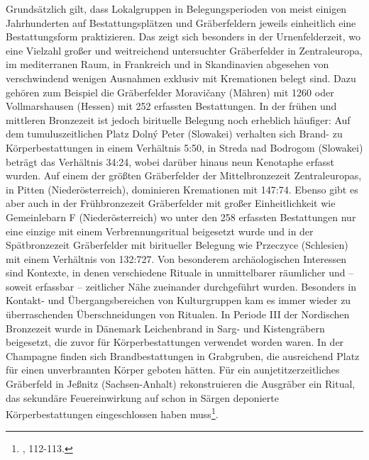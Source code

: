 \documentclass[openany,twoside,twocolumn]{book}
\let\rmarkdownfootnote\footnote%
\def\footnote{\protect\rmarkdownfootnote}
\begin{document}
Grundsätzlich gilt, dass Lokalgruppen in Belegungsperioden von meist
einigen Jahrhunderten auf Bestattungsplätzen und Gräberfeldern jeweils
einheitlich eine Bestattungsform praktizieren. Das zeigt sich besonders
in der Urnenfelderzeit, wo eine Vielzahl großer und weitreichend
untersuchter Gräberfelder in Zentraleuropa, im mediterranen Raum, in
Frankreich und in Skandinavien abgesehen von verschwindend wenigen
Ausnahmen exklusiv mit Kremationen belegt sind. Dazu gehören zum
Beispiel die Gräberfelder Moravičany (Mähren) mit 1260 oder
Vollmarshausen (Hessen) mit 252 erfassten Bestattungen. In der frühen
und mittleren Bronzezeit ist jedoch birituelle Belegung noch erheblich
häufiger: Auf dem tumuluszeitlichen Platz Dolný Peter (Slowakei)
verhalten sich Brand- zu Körperbestattungen in einem Verhältnis 5:50, in
Streda nad Bodrogom (Slowakei) beträgt das Verhältnis 34:24, wobei
darüber hinaus neun Kenotaphe erfasst wurden. Auf einem der größten
Gräberfelder der Mittelbronzezeit Zentraleuropas, in Pitten
(Niederösterreich), dominieren Kremationen mit 147:74. Ebenso gibt es
aber auch in der Frühbronzezeit Gräberfelder mit großer Einheitlichkeit
wie Gemeinlebarn F (Niederösterreich) wo unter den 258 erfassten
Bestattungen nur eine einzige mit einem Verbrennungsritual beigesetzt
wurde und in der Spätbronzezeit Gräberfelder mit biritueller Belegung
wie Przeczyce (Schlesien) mit einem Verhältnis von 132:727. Von
besonderem archäologischen Interessen sind Kontexte, in denen
verschiedene Rituale in unmittelbarer räumlicher und -- soweit erfassbar
-- zeitlicher Nähe zueinander durchgeführt wurden. Besonders in Kontakt-
und Übergangsbereichen von Kulturgruppen kam es immer wieder zu
überraschenden Überschneidungen von Ritualen. In Periode III der
Nordischen Bronzezeit wurde in Dänemark Leichenbrand in Sarg- und
Kistengräbern beigesetzt, die zuvor für Körperbestattungen verwendet
worden waren. In der Champagne finden sich Brandbestattungen in
Grabgruben, die ausreichend Platz für einen unverbrannten Körper geboten
hätten. Für ein aunjetitzerzeitliches Gräberfeld in Jeßnitz
(Sachsen-Anhalt) rekonstruieren die Ausgräber ein Ritual, das sekundäre
Feuereinwirkung auf schon in Särgen deponierte Körperbestattungen
eingeschlossen haben muss\footnote{\textcite{harding_european_2000},
  112-113.}.
\end{document}
